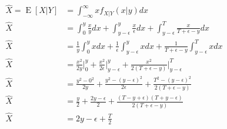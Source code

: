 \documentclass{article}
\theoremstyle{mytheoremstyle}
\theoremstyle{mytheoremstyle}
\theoremstyle{myproblemstyle}
\begin{document}
\begin{equation}
    \begin{split}
        \hat{X}=\operatorname{E}[X|Y]&=\int_{-\infty}^{\infty}xf_{X|Y}(x|y)dx\\
        \hat{X}&=\int_{0}^{y}\frac{x}{y}dx+\int_{y-\epsilon}^{y}\frac{x}{\epsilon}dx+\int_{y-\epsilon}^{T}\frac{x}{T+\epsilon-y}dx\\
        \hat{X}&=\frac{1}{y}\int_{0}^{y}xdx+\frac{1}{\epsilon}\int_{y-\epsilon}^{y}xdx+\frac{1}{T+\epsilon-y}\int_{y-\epsilon}^{T}xdx\\
        \hat{X}&=\frac{x^2}{2y}\bigg|_{0}^{y}+\frac{x^2}{2\epsilon}\bigg|_{y-\epsilon}^{y}+\frac{x^2}{2(T+\epsilon-y)}\bigg|_{y-\epsilon}^{T}\\
        \hat{X}&=\frac{y^2-0^2}{2y}+\frac{y^2-(y-\epsilon)^2}{2\epsilon}+\frac{T^2-(y-\epsilon)^2}{2(T+\epsilon-y)}\\
        \hat{X}&=\frac{y}{2}+\frac{2y-\epsilon}{2}+\frac{(T-y+\epsilon)(T+y-\epsilon)}{2(T+\epsilon-y)}\\
        \hat{X}&=2y-\epsilon+\frac{T}{2}\\
    \end{split}
\end{equation}
\end{document}
